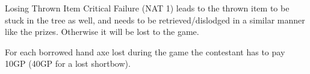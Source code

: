 \begin{DndOptionalRule}{Losing Thrown Item}
	Critical Failure (NAT 1) leads to the thrown item to be stuck in the tree as well, and needs to be retrieved/dislodged in a similar manner like the prizes. Otherwise it will be lost to the game.
	
	For each borrowed hand axe lost during the game the contestant has to pay 10GP (40GP for a lost shortbow).
\end{DndOptionalRule}